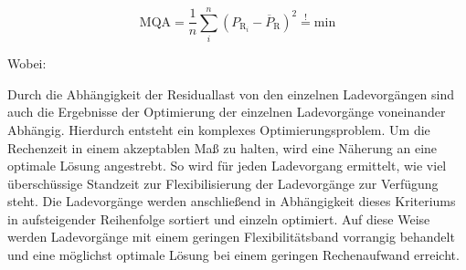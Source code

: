 \begin{equation}
	\text{MQA} = \frac{1}{n} \sum_i^n \left( P_{\text{R}_i} - \overline{P}_{\text{R}} \right)^2 \stackrel{!}{=} \text{min}
	\label{eq:residual}
\end{equation}

\noindent Wobei:


Durch die Abhängigkeit der Residuallast von den einzelnen Ladevorgängen sind auch die Ergebnisse der Optimierung der einzelnen Ladevorgänge voneinander Abhängig.
Hierdurch entsteht ein komplexes Optimierungsproblem.
Um die Rechenzeit in einem akzeptablen Maß zu halten, wird eine Näherung an eine optimale Lösung angestrebt.
So wird für jeden Ladevorgang ermittelt, wie viel überschüssige Standzeit zur Flexibilisierung der Ladevorgänge zur Verfügung steht.
Die Ladevorgänge werden anschließend in Abhängigkeit dieses Kriteriums in aufsteigender Reihenfolge sortiert und einzeln optimiert.
Auf diese Weise werden Ladevorgänge mit einem geringen Flexibilitätsband vorrangig behandelt und eine möglichst optimale Lösung bei einem geringen Rechenaufwand erreicht.


